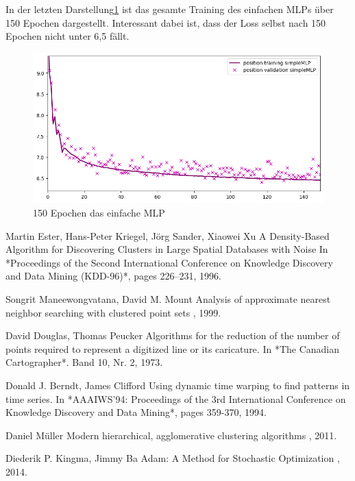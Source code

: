 \documentclass[a4paper]{article}
\begin{document}
    In der letzten Darstellung\ref{fig:training_simpler_mlp} ist das gesamte Training des einfachen MLPs über 150 Epochen dargestellt.
    Interessant dabei ist, dass der Loss selbst nach 150 Epochen nicht unter 6,5 fällt.

    \begin{figure}[h]
        \includegraphics[scale=0.6]{figures/fig8_training_simpler_mlp}
        \centering
        \caption{150 Epochen das einfache MLP}
        \label{fig:training_simpler_mlp}
    \end{figure}





    
    \begin{thebibliography}{10}

        Martin Ester, Hans-Peter Kriegel, Jörg Sander, Xiaowei Xu
        \newblock A Density-Based Algorithm for Discovering Clusters in Large Spatial Databases with Noise
        \newblock In *Proceedings of the Second International Conference on Knowledge Discovery and Data Mining (KDD-96)*, pages 226–231, 1996.

        Songrit Maneewongvatana, David M. Mount
        \newblock Analysis of approximate nearest neighbor searching with clustered point sets
        , 1999.

        David Douglas, Thomas Peucker
        \newblock Algorithms for the reduction of the number of points required to represent a digitized line or its caricature.
        \newblock In *The Canadian Cartographer*. Band 10, Nr. 2, 1973.

        Donald J. Berndt, James Clifford
        \newblock Using dynamic time warping to find patterns in time series.
        \newblock In *AAAIWS'94: Proceedings of the 3rd International Conference on Knowledge Discovery and Data Mining*, pages 359-370, 1994.

        Daniel Müller
        \newblock Modern hierarchical, agglomerative clustering algorithms
        , 2011.

        Diederik P. Kingma, Jimmy Ba
        \newblock Adam: A Method for Stochastic Optimization
        , 2014.

    \end{thebibliography}
\end{document}
